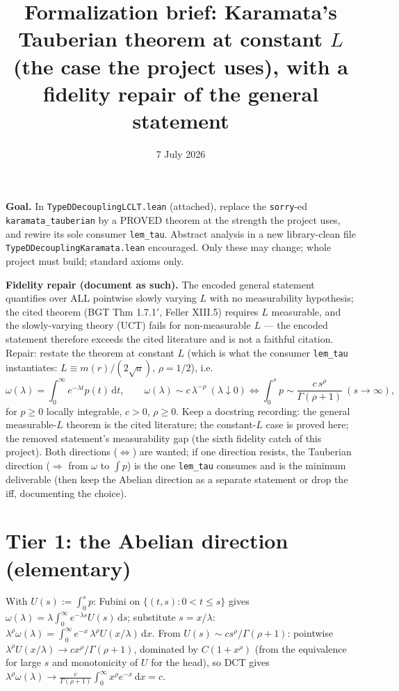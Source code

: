 \documentclass[11pt]{article}
\title{Formalization brief: Karamata's Tauberian theorem at constant $L$\\
(the case the project uses), with a fidelity repair of the general statement}
\date{7 July 2026}
\theoremstyle{plain}
\theoremstyle{remark}
\newcommand{\dd}{\,\mathrm d}
\begin{document}
\maketitle

\noindent\textbf{Goal.} In \texttt{TypeDDecouplingLCLT.lean} (attached),
replace the \texttt{sorry}-ed \texttt{karamata\_tauberian} by a PROVED theorem
at the strength the project uses, and rewire its sole consumer
\texttt{lem\_tau}. Abstract analysis in a new library-clean file
\texttt{TypeDDecouplingKaramata.lean} encouraged. Only these may change; whole
project must build; standard axioms only.

\textbf{Fidelity repair (document as such).} The encoded general statement
quantifies over ALL pointwise slowly varying $L$ with no measurability
hypothesis; the cited theorem (BGT Thm 1.7.1$'$, Feller XIII.5) requires $L$
measurable, and the slowly-varying theory (UCT) fails for non-measurable $L$
--- the encoded statement therefore exceeds the cited literature and is not a
faithful citation. Repair: restate the theorem at constant $L$ (which is what
the consumer \texttt{lem\_tau} instantiates: $L\equiv m(r)/(2\sqrt a)$,
$\rho=1/2$), i.e.
\[
  \omega(\lambda)=\int_0^\infty e^{-\lambda t}p(t)\dd t,\qquad
  \omega(\lambda)\sim c\,\lambda^{-\rho}\ (\lambda\downarrow0)
  \iff
  \int_0^sp\sim \frac{c\,s^{\rho}}{\Gamma(\rho+1)}\ (s\to\infty),
\]
for $p\ge0$ locally integrable, $c>0$, $\rho\ge0$. Keep a docstring recording:
the general measurable-$L$ theorem is the cited literature; the constant-$L$
case is proved here; the removed statement's measurability gap (the sixth
fidelity catch of this project). Both directions ($\iff$) are wanted; if one
direction resists, the Tauberian direction ($\Rightarrow$ from $\omega$ to
$\int p$) is the one \texttt{lem\_tau} consumes and is the minimum
deliverable (then keep the Abelian direction as a separate statement or drop
the iff, documenting the choice).

\section*{Tier 1: the Abelian direction (elementary)}

With $U(s):=\int_0^sp$: Fubini on $\{(t,s):0<t\le s\}$ gives
$\omega(\lambda)=\lambda\int_0^\infty e^{-\lambda s}U(s)\dd s$; substitute
$s=x/\lambda$:
$\lambda^{\rho}\omega(\lambda)=\int_0^\infty e^{-x}\,\lambda^{\rho}
U(x/\lambda)\dd x$. From $U(s)\sim cs^\rho/\Gamma(\rho+1)$: pointwise
$\lambda^\rho U(x/\lambda)\to cx^\rho/\Gamma(\rho+1)$, dominated by
$C(1+x^\rho)$ (from the equivalence for large $s$ and monotonicity of $U$ for
the head), so DCT gives
$\lambda^\rho\omega(\lambda)\to\frac c{\Gamma(\rho+1)}\int_0^\infty
x^\rho e^{-x}\dd x=c$.
\end{document}
